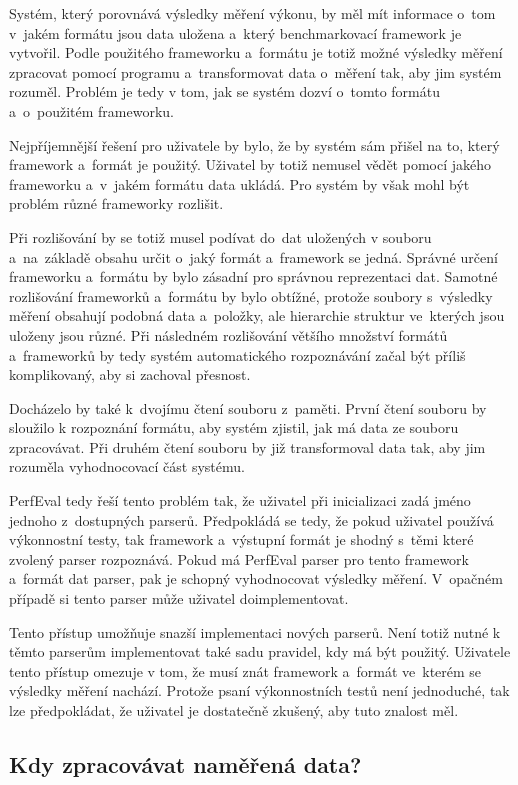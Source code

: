 Systém, který porovnává výsledky měření výkonu, by měl mít informace o~tom v~jakém formátu jsou data uložena
a~který benchmarkovací framework je vytvořil. Podle použitého frameworku a~formátu je totiž možné výsledky
měření zpracovat pomocí programu a~transformovat data o~měření tak, aby jim systém rozuměl.
Problém je tedy v tom, jak se systém dozví o~tomto formátu a~o~použitém frameworku.

Nejpříjemnější řešení pro uživatele by bylo, že by systém sám přišel na to, který framework a~formát je použitý.
Uživatel by totiž nemusel vědět pomocí jakého frameworku a~v~jakém formátu data ukládá. Pro systém by však mohl
být problém různé frameworky rozlišit.

Při rozlišování by se totiž musel podívat do~dat uložených v souboru
a~na~základě obsahu určit o~jaký formát a~framework se jedná. Správné určení frameworku a~formátu by bylo zásadní pro
správnou reprezentaci dat. Samotné rozlišování frameworků a~formátu by bylo obtížné, protože soubory s~výsledky
měření obsahují podobná data a~položky, ale hierarchie struktur ve~kterých jsou uloženy jsou různé.
Při následném rozlišování většího množství formátů a~frameworků by tedy systém automatického rozpoznávání
začal být příliš komplikovaný, aby si zachoval přesnost.

Docházelo by také k~dvojímu čtení souboru z~paměti. První čtení souboru by sloužilo k rozpoznání formátu,
aby systém zjistil, jak má data ze souboru zpracovávat. Při druhém čtení souboru by již transformoval data
tak, aby jim rozuměla vyhodnocovací část systému.

PerfEval tedy řeší tento problém tak, že uživatel při inicializaci zadá jméno jednoho z~dostupných parserů.
Předpokládá se tedy, že pokud uživatel používá výkonnostní testy, tak framework a~výstupní formát je shodný s~těmi které zvolený parser rozpoznává.
Pokud má PerfEval parser pro tento framework a~formát dat parser, pak je schopný vyhodnocovat výsledky měření.
V~opačném případě si tento parser může uživatel doimplementovat.

Tento přístup umožňuje snazší implementaci nových parserů. Není totiž nutné k těmto parserům implementovat
také sadu pravidel, kdy má být použitý. Uživatele tento přístup omezuje v tom, že musí znát framework a~formát
ve~kterém se výsledky měření nachází. Protože psaní výkonnostních testů není jednoduché, tak lze předpokládat,
že uživatel je dostatečně zkušený, aby tuto znalost měl.

\subsection{Kdy zpracovávat naměřená data?}

